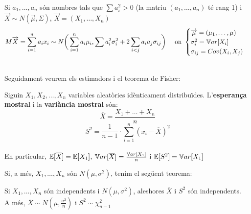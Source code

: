 \begin{col}
  Si $a_{1},\ldots,a_{n}$ són nombres tals que $\sum a_{i}^2 > 0$ (la matriu $(a_{1},\ldots,a_{n})$ té rang 1) i $\overrightarrow{X}\sim N(\overrightarrow{\mu}, \Sigma)$, $\overrightarrow{X} = (X_{1},\ldots,X_{n})$
  \[
    M\overrightarrow{X} = \sum_{i=1}^{n} a_{i}x_{i} \sim N\bigg(\sum_{i=1}^{n} a_{i}\mu_{i}, \sum a_{i}^{2}\sigma_{i}^{2} + 2\sum_{i<j}a_{i}a_{j}\sigma_{ij}\bigg) \quad \text{ on } 
    \begin{cases}
      \overrightarrow{\mu} = (\mu_{1},\ldots,\mu) \\
      \sigma_{i}^{2} = \mathbb{V} ar[X_{i}] \\
      \sigma_{ij} = Cov(X_{i}, X_{j})
    \end{cases}
  \]
\end{col}

\-\\
Seguidament veurem els estimadors i el teorema de Fisher:

\begin{defi}
  Siguin $X_{1}, X_{2}, \ldots, X_{n}$ variables aleatòries idènticament distribuïdes. L'\textbf{esperança mostral} i la \textbf{variància mostral} són: \\
  \[
    \overline{X} = \frac{X_{1}+\ldots+X_{n}}{n}
  \]
  \[
    S^{2} = \frac{1}{n-1}\cdot\sum_{i=1}^{n}(x_{i} - \overline{X})^{2}
  \]
  \-\\
  En particular, $\mathbb{E}[\overline{X}] = \mathbb{E}[X_{1}]$, $\mathbb{V} ar[\overline{X}] = \frac{\mathbb{V} ar[X_{1}]}{n}$ i $\mathbb{E}[S^{2}] = \mathbb{V} ar[X_{1}]$ \\
  
\end{defi}

Si, a més, $X_{1},\ldots,X_{n}$ són $N(\mu,\sigma^{2})$, tenim el següent teorema:

\begin{thm}[Fisher]
  Si $X_{1},\ldots, X_{n}$ són independents i $N(\mu, \sigma^{2})$, aleshores $\overline{X}$ i $S^{2}$ són independents. \\ 
  A més, $\overline{X} \sim N(\mu, \frac{\sigma^{2}}{n})$ i $S^{2} \sim \chi_{n-1}^{2}$
\end{thm}
